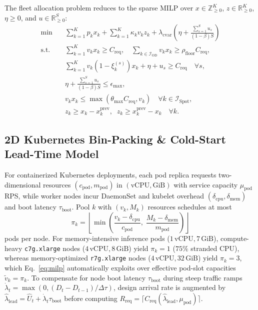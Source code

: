 \documentclass[journal]{IEEEtran}
\begin{document}
The fleet allocation problem reduces to the sparse MILP over $x \in \mathbb{Z}_{\ge 0}^K$, $z \in \mathbb{R}_{\ge 0}^K$, $\eta \ge 0$, and $u \in \mathbb{R}_{\ge 0}^S$:
\begin{equation}\label{eq:milp}
\begin{aligned}
    \min \quad & \sum_{k=1}^K p_k x_k + \sum_{k=1}^K \kappa_k v_k z_k + \lambda_{\mathrm{cvar}}\!\left(\eta + \frac{\sum_{s=1}^S u_s}{(1-\beta)S}\right) \\
    \text{s.t.} \quad & \sum_{k=1}^K v_k x_k \ge C_{\mathrm{req}}, \quad \sum_{k \in \mathcal{I}_{\mathrm{OD}}} v_k x_k \ge \rho_{\mathrm{floor}} C_{\mathrm{req}}, \\
    & \sum_{k=1}^K v_k(1 - \xi_k^{(s)})x_k + \eta + u_s \ge C_{\mathrm{req}} \quad \forall s, \\
    & \eta + \frac{\sum_{s=1}^S u_s}{(1-\beta)S} \le \epsilon_{\max}, \\
    & v_k x_k \le \max(\theta_{\max} C_{\mathrm{req}}, v_k) \quad \forall k \in \mathcal{I}_{\mathrm{Spot}}, \\
    & z_k \ge x_k - x_k^{\mathrm{prev}}, \;\; z_k \ge x_k^{\mathrm{prev}} - x_k \quad \forall k.
\end{aligned}
\end{equation}

\subsection{2D Kubernetes Bin-Packing \& Cold-Start Lead-Time Model}

For containerized Kubernetes deployments, each pod replica requests two-dimensional resources $(c_{\mathrm{pod}}, m_{\mathrm{pod}})$ in $(\text{vCPU}, \text{GiB})$ with service capacity $\mu_{\mathrm{pod}}$ RPS, while worker nodes incur DaemonSet and kubelet overhead $(\delta_{\mathrm{cpu}}, \delta_{\mathrm{mem}})$ and boot latency $\tau_{\mathrm{boot}}$. Pool $k$ with $(v_k, M_k)$ resources schedules at most
\begin{equation}\label{eq:binpack}
    \pi_k = \left\lfloor \min\!\left(\frac{v_k - \delta_{\mathrm{cpu}}}{c_{\mathrm{pod}}}, \; \frac{M_k - \delta_{\mathrm{mem}}}{m_{\mathrm{pod}}}\right) \right\rfloor
\end{equation}
pods per node. For memory-intensive inference pods ($1\,\text{vCPU}, 7\,\text{GiB}$), compute-heavy \texttt{c7g.xlarge} nodes ($4\,\text{vCPU}, 8\,\text{GiB}$) yield $\pi_k = 1$ ($75\%$ stranded CPU), whereas memory-optimized \texttt{r7g.xlarge} nodes ($4\,\text{vCPU}, 32\,\text{GiB}$) yield $\pi_k = 3$, which Eq.~\eqref{eq:milp} automatically exploits over effective pod-slot capacities $\tilde{v}_k = \pi_k$. To compensate for node boot latency $\tau_{\mathrm{boot}}$ during steep traffic ramps $\dot{\lambda}_t = \max(0, (D_t - D_{t-1})/\Delta\tau)$, design arrival rate is augmented by $\hat{\lambda}_{\mathrm{lead}} = \hat{U}_t + \dot{\lambda}_t \tau_{\mathrm{boot}}$ before computing $R_{\mathrm{req}} = \lceil C_{\mathrm{req}}(\hat{\lambda}_{\mathrm{lead}}, \mu_{\mathrm{pod}}) \rceil$.
\end{document}
